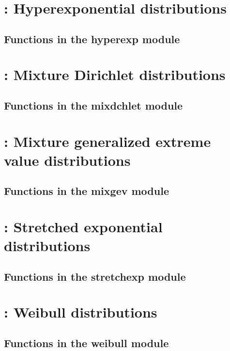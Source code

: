 \documentclass[10pt]{book}
\begin{document}
\newpage
\section{: Hyperexponential distributions}

\subsection{Functions in the hyperexp module}


\newpage
\section{: Mixture Dirichlet distributions}
%
\subsection{Functions in the mixdchlet module}
%

\newpage
\section{: Mixture generalized extreme value distributions}
%
\subsection{Functions in the mixgev module}


\newpage
\section{: Stretched exponential distributions}

\subsection{Functions in the stretchexp module}


\newpage
\section{: Weibull distributions}

\subsection{Functions in the weibull module}

\end{document}
